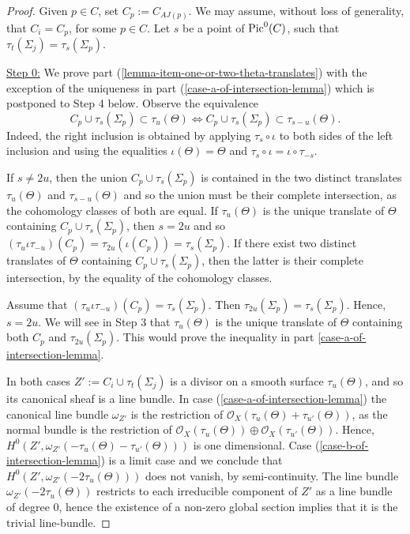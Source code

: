 \documentclass[12pt]{amsart}
\numberwithin{equation}{subsection}
\theoremstyle{plain}
\theoremstyle{definition}
\newcommand{\StructureSheaf}[1]{{\mathcal O}_{#1}}
\newcommand{\Pic}{{\rm Pic}}
\begin{document}
\begin{proof}
Given $p\in C$, set $C_p:=C_{AJ(p)}$.  We may assume, without loss of generality, that $C_i=C_p$, for some $p\in C$. 
Let $s$ be a point of $\Pic^0(C)$, such that $\tau_t(\Sigma_j)=\tau_s(\Sigma_p)$.


\underline{Step 0:} We prove part (\ref{lemma-item-one-or-two-theta-translates})  with the exception of the uniqueness in part (\ref{case-a-of-intersection-lemma}) which is postponed to Step 4 below.
Observe  the equivalence 
\begin{equation}
\label{equivalence-of-inclusions}
C_p\cup \tau_s(\Sigma_p)\subset \tau_u(\Theta)
\Leftrightarrow
C_p\cup \tau_s(\Sigma_p)\subset \tau_{s-u}(\Theta).
\end{equation}
Indeed, the right inclusion is obtained by applying $\tau_s\circ\iota$ to both sides of the left inclusion and using the equalities $\iota(\Theta)=\Theta$ and $\tau_s\circ\iota=\iota\circ\tau_{-s}$.

If $s\neq 2u$, then the union $C_p\cup \tau_s(\Sigma_p)$ is contained in the two distinct translates $\tau_u(\Theta)$ and
$\tau_{s-u}(\Theta)$ and so the union must be their complete intersection, as the cohomology classes of both are equal. If $\tau_u(\Theta)$ is the unique translate of $\Theta$ containing $C_p\cup \tau_s(\Sigma_p)$, then
$s=2u$ and so $(\tau_u\iota\tau_{-u})(C_p)=\tau_{2u}(\iota(C_p))=\tau_s(\Sigma_p)$. 
If there exist two distinct translates of $\Theta$ containing $C_p\cup \tau_s(\Sigma_p)$, then the latter is their complete intersection, by the equality of the cohomology classes. 

Assume that $(\tau_u\iota\tau_{-u})(C_p)=\tau_s(\Sigma_p)$. Then $\tau_{2u}(\Sigma_p)=\tau_s(\Sigma_p)$. Hence, $s=2u$.
We will see 
in Step 3 that $\tau_u(\Theta)$ is the unique translate of $\Theta$ containing both $C_p$ and $\tau_{2u}(\Sigma_p)$. This would prove the inequality in part \ref{case-a-of-intersection-lemma}.

In both cases $Z':=C_i\cup\tau_t(\Sigma_j)$ is a divisor on a smooth surface $\tau_u(\Theta)$, and so its canonical sheaf is a line bundle.
In case (\ref{case-a-of-intersection-lemma}) the canonical line bundle $\omega_{Z'}$  is the restriction of
$\StructureSheaf{X}(\tau_u(\Theta)+\tau_{u'}(\Theta))$, as the normal bundle is the restriction of 
$\StructureSheaf{X}(\tau_u(\Theta))\oplus \StructureSheaf{X}(\tau_{u'}(\Theta))$.
Hence, $H^0(Z',\omega_{Z'}(-\tau_u(\Theta)-\tau_{u'}(\Theta)))$ is one dimensional. Case (\ref{case-b-of-intersection-lemma})
is a limit case and we conclude that $H^0(Z',\omega_{Z'}(-2\tau_u(\Theta)))$ does not vanish, by semi-continuity. The line bundle 
$\omega_{Z'}(-2\tau_u(\Theta))$ restricts to each irreducible component of $Z'$ as a line bundle of degree $0$, hence the existence of a non-zero global section implies that it is the trivial line-bundle.


\end{proof}
\end{document}
